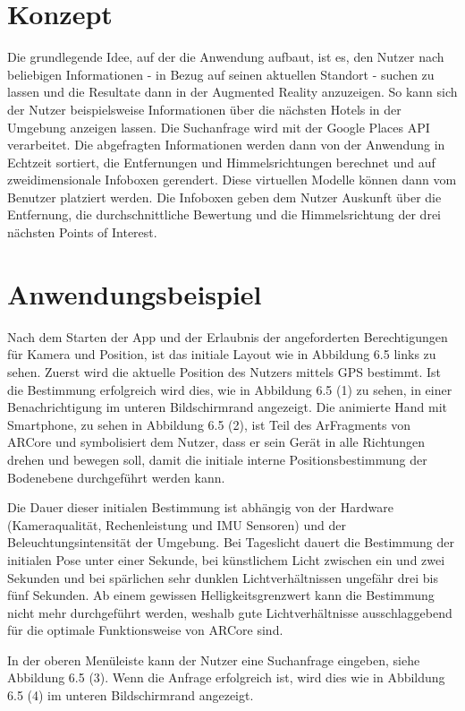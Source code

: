 \section{Konzept}

Die grundlegende Idee, auf der die Anwendung aufbaut, ist es, den Nutzer nach beliebigen Informationen - in Bezug auf seinen aktuellen Standort - suchen zu lassen und die Resultate dann in der Augmented Reality anzuzeigen. So kann sich der Nutzer beispielsweise Informationen über die nächsten Hotels in der Umgebung anzeigen lassen. Die Suchanfrage wird mit der Google Places API verarbeitet. Die abgefragten Informationen werden dann von der Anwendung in Echtzeit sortiert, die Entfernungen und Himmelsrichtungen berechnet und auf zweidimensionale Infoboxen gerendert. Diese virtuellen Modelle können dann vom Benutzer platziert werden. Die Infoboxen geben dem Nutzer Auskunft über die Entfernung, die durchschnittliche Bewertung und die Himmelsrichtung der drei nächsten Points of Interest.

\section{Anwendungsbeispiel}

Nach dem Starten der App und der Erlaubnis der angeforderten Berechtigungen für Kamera und Position, ist das initiale Layout wie in Abbildung 6.5 links zu sehen. Zuerst wird die aktuelle Position des Nutzers mittels GPS bestimmt. Ist die Bestimmung erfolgreich wird dies, wie in Abbildung 6.5 (1) zu sehen, in einer Benachrichtigung im unteren Bildschirmrand angezeigt. Die animierte Hand mit Smartphone, zu sehen in Abbildung 6.5 (2), ist Teil des ArFragments von ARCore und symbolisiert dem Nutzer, dass er sein Gerät in alle Richtungen drehen und bewegen soll, damit die initiale interne Positionsbestimmung der Bodenebene durchgeführt werden kann. 

Die Dauer dieser initialen Bestimmung ist abhängig von der Hardware (Kameraqualität, Rechenleistung und IMU Sensoren) und der Beleuchtungsintensität der Umgebung. Bei Tageslicht dauert die Bestimmung der initialen Pose unter einer Sekunde, bei künstlichem Licht zwischen ein und zwei Sekunden und bei spärlichen sehr dunklen Lichtverhältnissen ungefähr drei bis fünf Sekunden. Ab einem gewissen Helligkeitsgrenzwert kann die Bestimmung nicht mehr durchgeführt werden, weshalb gute Lichtverhältnisse ausschlaggebend für die optimale Funktionsweise von ARCore sind.

In der oberen Menüleiste kann der Nutzer eine Suchanfrage eingeben, siehe Abbildung 6.5 (3). Wenn die Anfrage erfolgreich ist, wird dies wie in Abbildung 6.5 (4) im unteren Bildschirmrand angezeigt. 

